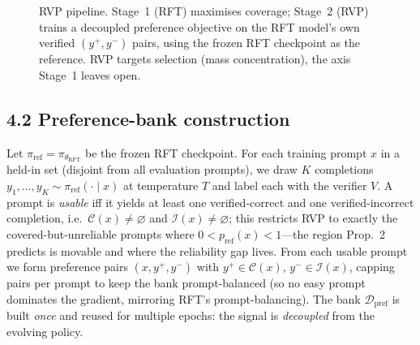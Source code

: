 \begin{figure}[htbp]
\centering
{}
\caption{RVP pipeline. Stage~1 (RFT) maximises coverage; Stage~2 (RVP) trains a
decoupled preference objective on the RFT model's own verified $(y^{+},y^{-})$
pairs, using the frozen RFT checkpoint as the reference. RVP targets selection
(mass concentration), the axis Stage~1 leaves open.}
\label{fig:pipeline}
\end{figure}

\subsection*{4.2 Preference-bank construction}

Let $\pi_{\text{ref}}=\pi_{\theta_{\text{RFT}}}$ be the frozen RFT checkpoint. For
each training prompt $x$ in a held-in set (disjoint from all evaluation prompts),
we draw $K$ completions $y_1,\dots,y_K\sim\pi_{\text{ref}}(\cdot\mid x)$ at
temperature $T$ and label each with the verifier $V$. A prompt is \emph{usable}
iff it yields at least one verified-correct and one verified-incorrect completion,
i.e.\ $\mathcal{C}(x)\neq\varnothing$ and $\mathcal{I}(x)\neq\varnothing$; this
restricts RVP to exactly the covered-but-unreliable prompts where
$0<p_{\text{ref}}(x)<1$---the region Prop.~2 predicts is movable and where the
reliability gap lives. From each usable prompt we form preference pairs
$(x,y^{+},y^{-})$ with $y^{+}\!\in\!\mathcal{C}(x)$, $y^{-}\!\in\!\mathcal{I}(x)$,
capping pairs per prompt to keep the bank prompt-balanced (so no easy prompt
dominates the gradient, mirroring RFT's prompt-balancing). The bank
$\mathcal{D}_{\text{pref}}$ is built \emph{once} and reused for multiple epochs:
the signal is \emph{decoupled} from the evolving policy.

